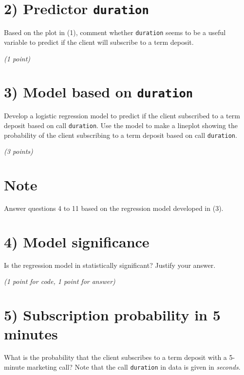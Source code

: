 \documentclass[
  letterpaper,
  DIV=11,
  numbers=noendperiod]{scrreprt}
\begin{document}
\section{\texorpdfstring{2) Predictor
\texttt{duration}}{2) Predictor duration}}\label{predictor-duration}

Based on the plot in (1), comment whether \texttt{duration} seems to be
a useful variable to predict if the client will subscribe to a term
deposit.

\emph{(1 point)}

\section{\texorpdfstring{3) Model based on
\texttt{duration}}{3) Model based on duration}}\label{model-based-on-duration}

Develop a logistic regression model to predict if the client subscribed
to a term deposit based on call \texttt{duration}. Use the model to make
a lineplot showing the probability of the client subscribing to a term
deposit based on call \texttt{duration}.

\emph{(3 points)}

\section*{Note}\label{note}


Answer questions 4 to 11 based on the regression model developed in (3).

\section{4) Model significance}\label{model-significance}

Is the regression model in statistically significant? Justify your
answer.

\emph{(1 point for code, 1 point for answer)}

\section{5) Subscription probability in 5
minutes}\label{subscription-probability-in-5-minutes}

What is the probability that the client subscribes to a term deposit
with a 5-minute marketing call? Note that the call \texttt{duration} in
data is given in \emph{seconds}.
\end{document}
